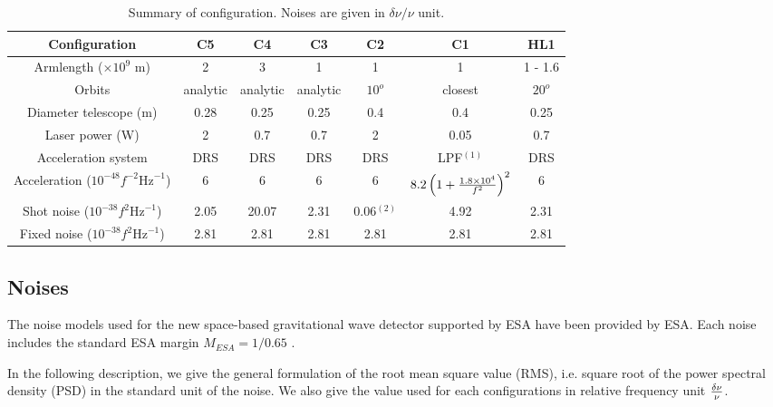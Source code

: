 \documentclass{iopart}
\begin{document}
\begin{table}[H]
\begin{center}
\begin{tabular}{|c|c|c|c|c|c|c|}
\hline
Configuration 				& C5 	& C4	 	& C3 	& C2 	& C1  	& HL1 	\\
\hline
Armlength ($\times 10^9 $ m) 	& 2 		& 3 		& 1		& 1		& 1 	  	&  1 - 1.6 		\\
Orbits					& analytic & analytic & analytic & $10^o$ & closest 	& $20^o$ \\
\hline
Diameter telescope (m) 		& 0.28 	& 0.25 	& 0.25	& 0.4		& 0.4 	&  0.25 	\\
Laser power (W) 			& 2	 	& 0.7 	& 0.7		& 2		& 0.05 	&  0.7 		\\
Acceleration system 			& DRS	& DRS 	& DRS	& DRS	& LPF$^{(1)}$	&  DRS 	\\
\hline
Acceleration ($ 10^{-48} f^{-2} \textrm{Hz}^{-1}$)  & 6	&  6	& 6	& 6	&  $8.2\left( 1 + {  1.8 \times 10^4 \over f^2 }  \right) ^ 2 $	&   6 \\  %
Shot noise ($ 10^{-38} f^{2}  \textrm{Hz}^{-1}$)  &  2.05 &  20.07 &  2.31 & 0.06$^{(2)}$  & 4.92 & 2.31 \\ %
Fixed noise ($10^{-38} f^{2} \textrm{Hz}^{-1}$)  &  2.81 &  2.81 &  2.81 & 2.81  & 2.81 &  2.81 \\ %
\hline
\end{tabular}
\end{center}
\caption{Summary of configuration. Noises are given in $\delta \nu / \nu$ unit.} %
\label{T:Configs}
\end{table}%


\subsection{Noises}
\label{SS:Inst:Noises}
The noise models used for the new space-based gravitational wave detector supported by ESA have been provided by ESA.
Each noise includes the standard ESA margin $M_{ESA} = 1 / 0.65 $ .

In the following description, we give the general formulation of the root mean square value (RMS), i.e. square root of the power spectral density (PSD) in the standard unit of the noise. 
We also give the value used for each configurations in relative frequency unit $\delta \nu \over \nu$.
\end{document}
